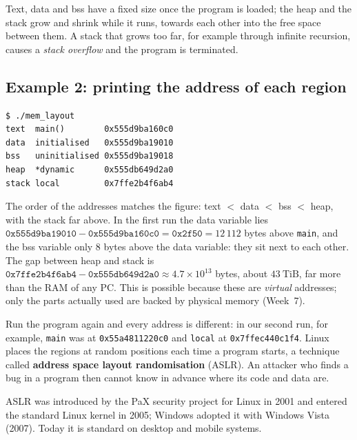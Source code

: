 \documentclass[11pt,a4paper]{article}
\newcommand{\term}[1]{\textbf{\color{mintdeep}#1}}
\begin{document}
Text, data and bss have a fixed size once the program is loaded; the heap and the stack grow and shrink while it runs, towards each other into the free space between them. A stack that grows too far, for example through infinite recursion, causes a \emph{stack overflow} and the program is terminated.

\subsection{Example 2: printing the address of each region}



\begin{lstlisting}[style=term]
$ ./mem_layout
text  main()        0x555d9ba160c0
data  initialised   0x555d9ba19010
bss   uninitialised 0x555d9ba19018
heap  *dynamic      0x555db649d2a0
stack local         0x7ffe2b4f6ab4
\end{lstlisting}

The order of the addresses matches the figure: text $<$ data $<$ bss $<$ heap, with the stack far above. In the first run the data variable lies $\texttt{0x555d9ba19010} - \texttt{0x555d9ba160c0} = \texttt{0x2f50} = 12\,112$ bytes above \texttt{main}, and the bss variable only $8$ bytes above the data variable: they sit next to each other. The gap between heap and stack is $\texttt{0x7ffe2b4f6ab4} - \texttt{0x555db649d2a0} \approx 4.7\times10^{13}$ bytes, about $43\ \text{TiB}$, far more than the RAM of any PC. This is possible because these are \emph{virtual} addresses; only the parts actually used are backed by physical memory (Week~7).

Run the program again and every address is different: in our second run, for example, \texttt{main} was at \texttt{0x55a4811220c0} and \texttt{local} at \texttt{0x7ffec440c1f4}. Linux places the regions at random positions each time a program starts, a technique called \term{address space layout randomisation} (ASLR). An attacker who finds a bug in a program then cannot know in advance where its code and data are.

\begin{histnote}[ASLR]
ASLR was introduced by the PaX security project for Linux in 2001 and entered the standard Linux kernel in 2005; Windows adopted it with Windows Vista (2007). Today it is standard on desktop and mobile systems.
\end{histnote}

\end{document}
